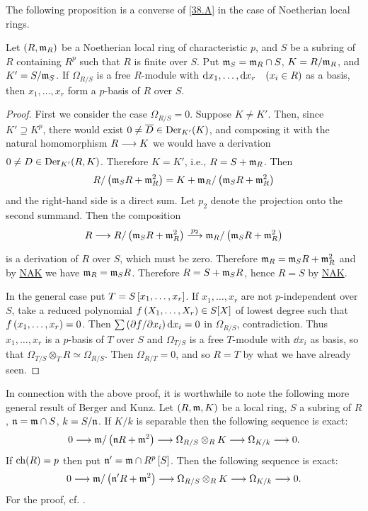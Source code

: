\documentclass[../main]{subfiles}
\begin{document}
The following proposition is a converse of \ref{38.A} in the case of Noetherian local rings.
\begin{proposition}
\label{prop:38.01}
    Let $(R,\mathfrak{m}_R)$ be a Noetherian local ring of characteristic $p$, and $S$ be a subring of $R$ containing $R^p$ such that $R$ is finite over $S$. Put $\mathfrak{m}_S = \mathfrak{m}_R\cap S$, $K = R/\mathfrak{m}_R$, and $K' = S/\mathfrak{m}_S$. If $\Omega_{R/S}$ is a free $R$-module with $\dd{x_1}, \dots, \dd{x_r}\for{x_i \in R}$ as a basis, then $x_1, \dots, x_r$ form a $p$-basis of $R$ over $S$. 
\end{proposition}
\begin{proof}
    First we consider the case $\Omega_{R/S} = 0$. Suppose \newline $K \neq K'$. Then, since $K' \supseteq K^p$, there would exist $0 \neq \overline{D}\in \operatorname{Der}_{K'}(K)$, and composing it with the natural homomorphism $R \varrightarrow{} K$ we would have a derivation $0 \neq D \in \operatorname{Der}_{K'}(R,K)$. Therefore $K = K'$, i.e., $R = S+\mathfrak{m}_R$. Then \[R/\left(\mathfrak{m}_S R + \mathfrak{m}_R^2\right)=K+ \mathfrak{m}_R/\left(\mathfrak{m}_S R + \mathfrak{m}_R^2\right)\] and the right-hand side is a direct sum. Let $p_2$ denote the projection onto the second summand. Then the composition \[R\varrightarrow{} R/\br{\ideal{m}_S R + \ideal{m}^2_R} \varrightarrow[]{p_2} \ideal{m}_R/\br{\ideal{m}_S R + \ideal{m}^2_R}\] is a derivation of $R$ over $S$, which must be zero. Therefore $\mathfrak{m}_R=\mathfrak{m}_S R + \mathfrak{m}_R^2$ and by \hyperref[NAK]{NAK} we have $\mathfrak{m}_R = \mathfrak{m}_S R$. Therefore $R=S + \mathfrak{m}_S R$, hence $R=S$ by \hyperref[NAK]{NAK}. 

    In the general case put $T=S\left[x_1, \dots, x_r\right]$. If $x_1, \dots, x_r$ are not $p$-independent over $S$, take a reduced polynomial $f\left(X_1, \dots, X_r\right)\in S[X]$ of lowest degree such that $f\left(x_1, \dots, x_r\right)=0$. Then $\sum \left(\partial{f}/\partial{x_i}\right)\mathrm{d}x_i=0$ in $\Omega_{R/S}$, contradiction. Thus $x_1, \dots, x_r$ is a $p$-basis of $T$ over $S$ and $\Omega_{T/S}$ is a free $T$-module with $\dd{x_i}$ as basis, so that $\Omega_{T/S}\otimes_T R \simeq \Omega_{R/S}$. Then $\Omega_{R/T}=0$, and so $R = T$ by what we have already seen.
\end{proof}

\begin{remark*}
    In connection with the above proof, it is worthwhile to note the following more general result of Berger and Kunz. Let $(R, \mathfrak{m}, K)$ be a local ring, $S$ a subring of $R$, $\mathfrak{n}=\mathfrak{m}\cap S$, $k = S/\mathfrak{n}$. If $K/k$ is separable then the following sequence is exact: \[0\longrightarrow \mathfrak{m}/\left(\mathfrak{n}R+\mathfrak{m}^2\right)\longrightarrow \Omega_{R/S}\otimes_R K\longrightarrow \Omega_{K/k}\longrightarrow 0.\] If $\operatorname{ch}(R) = p$ then put $\mathfrak{n}' = \mathfrak{m}\cap R^p\left[S\right]$. Then the following sequence is exact: \[0\longrightarrow \mathfrak{m}/\left(\mathfrak{n}' R + \mathfrak{m}^2\right)\longrightarrow \Omega_{R/S}\otimes_R K\longrightarrow \Omega_{K/k}\longrightarrow 0.\] For the proof, cf. \cite{bergerkunz1961}.
\end{remark*}
\end{document}
